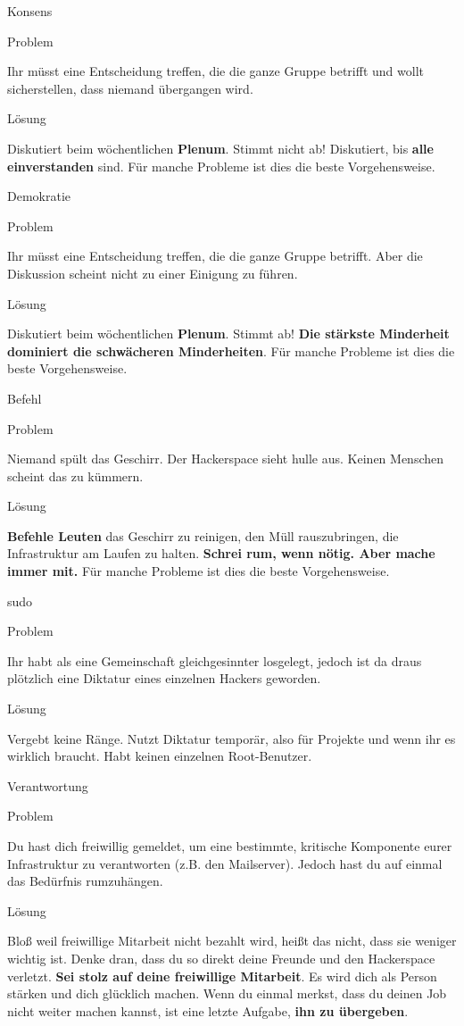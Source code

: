 \documentclass{beamer}
\newcommand{\pattern}[2]{
  \begin{alertblock}{Problem}
    #1
  \end{alertblock}
  \pause
  \begin{exampleblock}{Lösung}
    #2
  \end{exampleblock}
}
\begin{document}
  \begin{frame}{Konsens}
    \pattern{
      Ihr müsst eine Entscheidung treffen, die die ganze Gruppe betrifft und
      wollt sicherstellen, dass niemand übergangen wird.
    }{
      Diskutiert beim wöchentlichen \textbf{Plenum}. Stimmt nicht ab!
      Diskutiert, bis \textbf{alle einverstanden} sind. Für manche Probleme ist
      dies die beste Vorgehensweise.
    }
  \end{frame}

  \begin{frame}{Demokratie}
    \pattern{
      Ihr müsst eine Entscheidung treffen, die die ganze Gruppe betrifft.
      Aber die Diskussion scheint nicht zu einer Einigung zu führen.
    }{
      Diskutiert beim wöchentlichen \textbf{Plenum}. Stimmt ab!
      \textbf{Die stärkste Minderheit dominiert die schwächeren Minderheiten}.
      Für manche Probleme ist dies die beste Vorgehensweise.
    }
  \end{frame}

  \begin{frame}{Befehl}
    \pattern{
      Niemand spült das Geschirr. Der Hackerspace sieht hulle aus. Keinen
      Menschen scheint das zu kümmern.
    }{
      \textbf{Befehle Leuten} das Geschirr zu reinigen, den Müll rauszubringen,
      die Infrastruktur am Laufen zu halten. \textbf{Schrei rum, wenn nötig.
      Aber mache immer mit.} Für manche Probleme ist dies die beste
      Vorgehensweise.
    }
  \end{frame}

  \begin{frame}{sudo}
    \pattern{
      Ihr habt als eine Gemeinschaft gleichgesinnter losgelegt, jedoch ist da
      draus plötzlich eine Diktatur eines einzelnen Hackers geworden.
    }{
      Vergebt keine Ränge. Nutzt Diktatur temporär, also für Projekte und wenn
      ihr es wirklich braucht. Habt keinen einzelnen Root-Benutzer.
    }
  \end{frame}

  \begin{frame}{Verantwortung}
    \pattern{
      Du hast dich freiwillig gemeldet, um eine bestimmte, kritische Komponente
      eurer Infrastruktur zu verantworten (z.B. den Mailserver). Jedoch hast du
      auf einmal das Bedürfnis rumzuhängen.
    }{
      Bloß weil freiwillige Mitarbeit nicht bezahlt wird, heißt das nicht, dass
      sie weniger wichtig ist. Denke dran, dass du so direkt deine Freunde und
      den Hackerspace verletzt. \textbf{Sei stolz auf deine freiwillige
      Mitarbeit}. Es wird dich als Person stärken und dich glücklich machen.
      Wenn du einmal merkst, dass du deinen Job nicht weiter machen kannst, ist
      eine letzte Aufgabe, \textbf{ihn zu übergeben}.
    }
  \end{frame}
\end{document}
